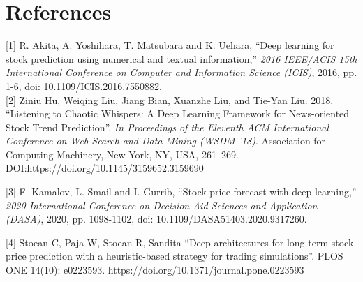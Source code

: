\documentclass{article}
\begin{document}
\section*{References}

\medskip
\small
[1] R. Akita, A. Yoshihara, T. Matsubara and K. Uehara, ``Deep learning for
stock prediction using numerical and textual information,'' \textit{2016 IEEE/ACIS 15th
International Conference on Computer and Information Science (ICIS)}, 2016, pp.
1-6, doi: 10.1109/ICIS.2016.7550882. \\

[2] Ziniu Hu, Weiqing Liu, Jiang Bian, Xuanzhe Liu, and Tie-Yan Liu. 2018.
``Listening to Chaotic Whispers: A Deep Learning Framework for News-oriented
Stock Trend Prediction''. \textit{In Proceedings of the Eleventh ACM
International Conference on Web Search and Data Mining (WSDM '18)}. Association for Computing Machinery, New York, NY, USA, 261–269. DOI:https://doi.org/10.1145/3159652.3159690

[3] F. Kamalov, L. Smail and I. Gurrib, ``Stock price forecast with deep
learning,'' \textit{2020 International Conference on Decision Aid Sciences and
Application (DASA)}, 2020, pp. 1098-1102, doi: 10.1109/DASA51403.2020.9317260.

[4] Stoean C, Paja W, Stoean R, Sandita ``Deep architectures for long-term stock
price prediction with a heuristic-based strategy for trading simulations''. PLOS ONE 14(10): e0223593. https://doi.org/10.1371/journal.pone.0223593 
\end{document}
